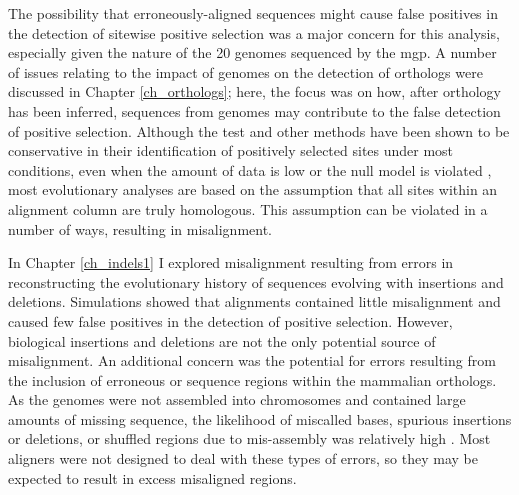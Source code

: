 The possibility that erroneously-aligned sequences might cause false
positives in the detection of sitewise positive selection was a major
concern for this analysis, especially given the \lcv nature of the 20
genomes sequenced by the \ac{mgp}. A number of issues relating to the
impact of \lcv genomes on the detection of orthologs were discussed in
Chapter \ref{ch_orthologs}; here, the focus was on how, after
orthology has been inferred, sequences from \lcv genomes may
contribute to the false detection of positive selection. Although the
\slr test and other \sw \ml methods have been shown to be conservative
in their identification of positively selected sites under most
conditions, even when the amount of data is low or the null model is
violated \citep{Anisimova2002,Anisimova2003,Massingham2005}, most
evolutionary analyses are based on the assumption that all sites
within an alignment column are truly homologous. This assumption can
be violated in a number of ways, resulting in misalignment.

In Chapter \ref{ch_indels1} I explored misalignment resulting from
errors in reconstructing the evolutionary history of sequences
evolving with insertions and deletions. Simulations showed that
\prankc alignments contained little misalignment and caused few false
positives in the \sw detection of positive selection. However,
biological insertions and deletions are not the only potential source
of misalignment. An additional concern was the potential for errors
resulting from the inclusion of erroneous or \nhom sequence regions
within the mammalian orthologs. As the \lcv genomes were not assembled
into chromosomes and contained large amounts of missing sequence, the
likelihood of miscalled bases, spurious insertions or deletions, or
shuffled regions due to mis-assembly was relatively high
\citep{Green2007}. Most aligners were not designed to deal with these
types of errors, so they may be expected to result in excess
misaligned regions.


